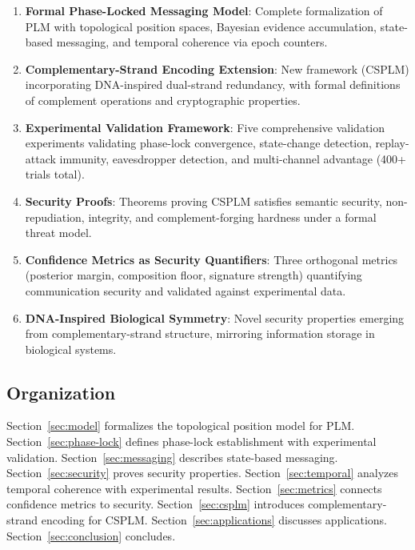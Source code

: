 \documentclass[twocolumn,10pt,a4paper]{article}
\theoremstyle{plain}
\theoremstyle{definition}
\begin{document}
\begin{enumerate}
\item \textbf{Formal Phase-Locked Messaging Model}: Complete formalization of PLM with topological position spaces, Bayesian evidence accumulation, state-based messaging, and temporal coherence via epoch counters.

\item \textbf{Complementary-Strand Encoding Extension}: New framework (CSPLM) incorporating DNA-inspired dual-strand redundancy, with formal definitions of complement operations and cryptographic properties.

\item \textbf{Experimental Validation Framework}: Five comprehensive validation experiments validating phase-lock convergence, state-change detection, replay-attack immunity, eavesdropper detection, and multi-channel advantage (400+ trials total).

\item \textbf{Security Proofs}: Theorems proving CSPLM satisfies semantic security, non-repudiation, integrity, and complement-forging hardness under a formal threat model.

\item \textbf{Confidence Metrics as Security Quantifiers}: Three orthogonal metrics (posterior margin, composition floor, signature strength) quantifying communication security and validated against experimental data.

\item \textbf{DNA-Inspired Biological Symmetry}: Novel security properties emerging from complementary-strand structure, mirroring information storage in biological systems.

\end{enumerate}

\subsection{Organization}

Section~\ref{sec:model} formalizes the topological position model for PLM. Section~\ref{sec:phase-lock} defines phase-lock establishment with experimental validation. Section~\ref{sec:messaging} describes state-based messaging. Section~\ref{sec:security} proves security properties. Section~\ref{sec:temporal} analyzes temporal coherence with experimental results. Section~\ref{sec:metrics} connects confidence metrics to security. Section~\ref{sec:csplm} introduces complementary-strand encoding for CSPLM. Section~\ref{sec:applications} discusses applications. Section~\ref{sec:conclusion} concludes.
\end{document}
